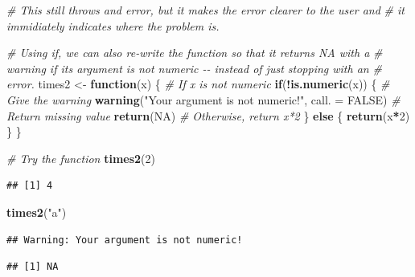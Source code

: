 \documentclass[
]{book}
\newenvironment{Shaded}{\begin{snugshade}}{\end{snugshade}}
\newcommand{\AttributeTok}[1]{\textcolor[rgb]{0.13,0.29,0.53}{#1}}
\newcommand{\CommentTok}[1]{\textcolor[rgb]{0.56,0.35,0.01}{\textit{#1}}}
\newcommand{\ConstantTok}[1]{\textcolor[rgb]{0.56,0.35,0.01}{#1}}
\newcommand{\ControlFlowTok}[1]{\textcolor[rgb]{0.13,0.29,0.53}{\textbf{#1}}}
\newcommand{\DecValTok}[1]{\textcolor[rgb]{0.00,0.00,0.81}{#1}}
\newcommand{\FunctionTok}[1]{\textcolor[rgb]{0.13,0.29,0.53}{\textbf{#1}}}
\newcommand{\NormalTok}[1]{#1}
\newcommand{\OtherTok}[1]{\textcolor[rgb]{0.56,0.35,0.01}{#1}}
\newcommand{\SpecialCharTok}[1]{\textcolor[rgb]{0.81,0.36,0.00}{\textbf{#1}}}
\newcommand{\StringTok}[1]{\textcolor[rgb]{0.31,0.60,0.02}{#1}}
\begin{document}
\begin{Shaded}
\begin{Highlighting}[]
\CommentTok{\# This still throws and error, but it makes the error clearer to the user and }
\CommentTok{\# it immidiately indicates where the problem is.}

\CommentTok{\# Using if, we can also re{-}write the function so that it returns NA with a}
\CommentTok{\# warning if its argument is not numeric {-}{-} instead of just stopping with an}
\CommentTok{\# error.}
\NormalTok{times2 }\OtherTok{\textless{}{-}} \ControlFlowTok{function}\NormalTok{(x) \{}
  \CommentTok{\# If x is not numeric}
  \ControlFlowTok{if}\NormalTok{(}\SpecialCharTok{!}\FunctionTok{is.numeric}\NormalTok{(x)) \{}
    \CommentTok{\# Give the warning}
    \FunctionTok{warning}\NormalTok{(}\StringTok{"Your argument is not numeric!"}\NormalTok{, }\AttributeTok{call. =} \ConstantTok{FALSE}\NormalTok{)}
    \CommentTok{\# Return missing value}
    \FunctionTok{return}\NormalTok{(}\ConstantTok{NA}\NormalTok{)}
    \CommentTok{\# Otherwise, return x*2}
\NormalTok{  \} }\ControlFlowTok{else}\NormalTok{ \{}
    \FunctionTok{return}\NormalTok{(x}\SpecialCharTok{*}\DecValTok{2}\NormalTok{)}
\NormalTok{  \}}
\NormalTok{\}}

\CommentTok{\# Try the function}
\FunctionTok{times2}\NormalTok{(}\DecValTok{2}\NormalTok{)}
\end{Highlighting}
\end{Shaded}

\begin{verbatim}
## [1] 4
\end{verbatim}

\begin{Shaded}
\begin{Highlighting}[]
\FunctionTok{times2}\NormalTok{(}\StringTok{"a"}\NormalTok{)}
\end{Highlighting}
\end{Shaded}

\begin{verbatim}
## Warning: Your argument is not numeric!
\end{verbatim}

\begin{verbatim}
## [1] NA
\end{verbatim}
\end{document}
